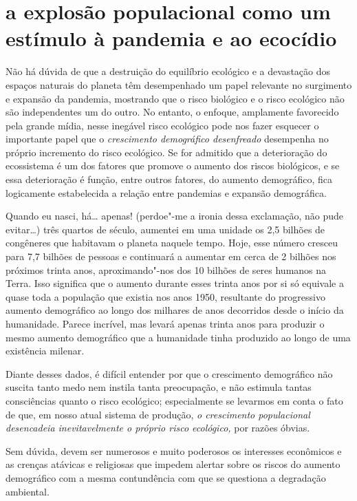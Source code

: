 \section{a explosão populacional como um estímulo à pandemia e ao
ecocídio}

Não há dúvida de que a destruição do equilíbrio ecológico e a devastação
dos espaços naturais do planeta têm desempenhado um papel relevante no
surgimento e expansão da pandemia, mostrando que o risco biológico e o
risco ecológico não são independentes um do outro. No entanto, o
enfoque, amplamente favorecido pela grande mídia, nesse inegável risco
ecológico pode nos fazer esquecer o importante papel que o
\textit{crescimento demográfico desenfreado} desempenha no próprio
incremento do risco ecológico. Se for admitido que a deterioração do
ecossistema é um dos fatores que promove o aumento dos riscos
biológicos, e se essa deterioração é função, entre outros fatores, do
aumento demográfico, fica logicamente estabelecida a relação entre
pandemias e expansão demográfica.

Quando eu nasci, há\ldots{} apenas! (perdoe"-me a ironia dessa
exclamação, não pude evitar\ldots{}) três quartos de século, aumentei em uma
unidade os 2,5 bilhões de congêneres que habitavam o planeta naquele
tempo. Hoje, esse número cresceu para 7,7 bilhões de pessoas e
continuará a aumentar em cerca de 2 bilhões nos próximos trinta anos,
aproximando"-nos dos 10 bilhões de seres humanos na Terra. Isso significa
que o aumento durante esses trinta anos por si só equivale a quase toda
a população que existia nos anos 1950, resultante do progressivo aumento
demográfico ao longo dos milhares de anos decorridos desde o início da
humanidade. Parece incrível, mas levará apenas trinta anos para produzir
o mesmo aumento demográfico que a humanidade tinha produzido ao longo de
uma existência milenar.

Diante desses dados, é difícil entender por que o crescimento
demográfico não suscita tanto medo nem instila tanta preocupação, e não
estimula tantas consciências quanto o risco ecológico; especialmente se
levarmos em conta o fato de que, em nosso atual sistema de produção,
\textit{o crescimento populacional desencadeia inevitavelmente o próprio
risco ecológico,} por razões óbvias.

Sem dúvida, devem ser numerosos e muito poderosos os interesses
econômicos e as crenças atávicas e religiosas que impedem alertar sobre
os riscos do aumento demográfico com a mesma contundência com que se
questiona a degradação ambiental.

